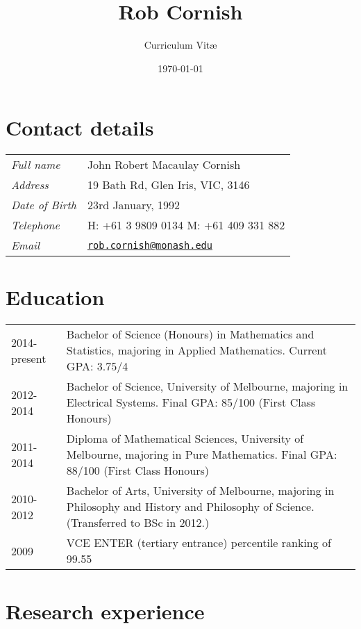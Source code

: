 \documentclass[12pt,a4paper]{article}
\title{\bfseries \huge Rob Cornish}
\author{Curriculum Vit\ae}
\date{\today}
\newcommand{\mailto}[1]{\href{mailto:#1}{\texttt{#1}}}
\newenvironment{llist}
	{\renewcommand{\arraystretch}{1.5}\begin{longtable}{p{3.5cm} p{12cm}}}
	{\end{longtable}}
\begin{document}
\maketitle

\thispagestyle{empty}

\section*{Contact details}
\begin{llist}
	\textit{Full name} & John Robert Macaulay Cornish \\
	\textit{Address} & 19 Bath Rd, Glen Iris, VIC, 3146 \\
	\textit{Date of Birth} & 23rd January, 1992 \\
	\textit{Telephone} & H: +61 3 9809 0134 \newline M: +61 409 331 882 \\
	\textit{Email} & \mailto{rob.cornish@monash.edu}
\end{llist}

\section*{Education}

\begin{llist}
  2014-present & Bachelor of Science (Honours) in Mathematics and Statistics,
  majoring in Applied Mathematics. Current GPA: 3.75/4 \\ 
  2012-2014 & Bachelor of Science, University of Melbourne, majoring in
  Electrical Systems. Final GPA: 85/100 (First Class Honours) \\
  2011-2014 & Diploma of Mathematical Sciences, University of Melbourne,
  majoring in Pure Mathematics. Final GPA: 88/100 (First Class Honours) \\
  2010-2012 & Bachelor of Arts, University of Melbourne, majoring in Philosophy
  and History and Philosophy of Science. (Transferred to BSc in 2012.) \\
	2009 & VCE ENTER (tertiary entrance) percentile ranking of 99.55 \\
\end{llist}

\section*{Research experience}
\end{document}
